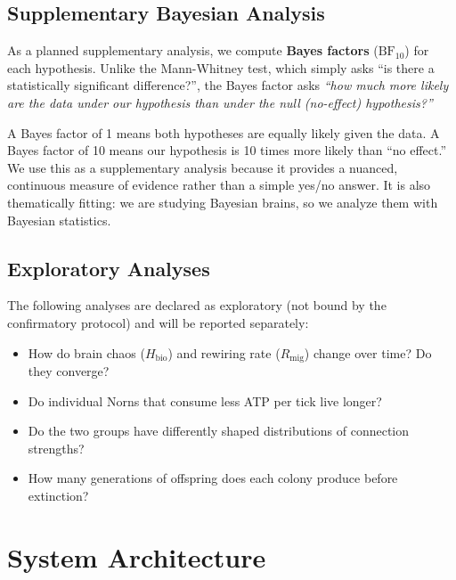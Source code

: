 \documentclass[12pt, a4paper]{article}
\newcommand{\Hbio}{H_{\mathrm{bio}}}
\newcommand{\Rmig}{R_{\mathrm{mig}}}
\begin{document}
\subsection{Supplementary Bayesian Analysis}

As a planned supplementary analysis, we compute \textbf{Bayes factors} ($\text{BF}_{10}$) for each hypothesis. Unlike the Mann-Whitney test, which simply asks ``is there a statistically significant difference?'', the Bayes factor asks \emph{``how much more likely are the data under our hypothesis than under the null (no-effect) hypothesis?''}

\begin{plainbox}
A Bayes factor of 1 means both hypotheses are equally likely given the data. A Bayes factor of 10 means our hypothesis is 10 times more likely than ``no effect.'' We use this as a supplementary analysis because it provides a nuanced, continuous measure of evidence rather than a simple yes/no answer. It is also thematically fitting: we are studying Bayesian brains, so we analyze them with Bayesian statistics.
\end{plainbox}

\subsection{Exploratory Analyses}

The following analyses are declared as exploratory (not bound by the confirmatory protocol) and will be reported separately:
\begin{itemize}[nosep]
  \item How do brain chaos ($\Hbio$) and rewiring rate ($\Rmig$) change over time? Do they converge?
  \item Do individual Norns that consume less ATP per tick live longer?
  \item Do the two groups have differently shaped distributions of connection strengths?
  \item How many generations of offspring does each colony produce before extinction?
\end{itemize}

\section{System Architecture}
\label{sec:architecture}
\end{document}
